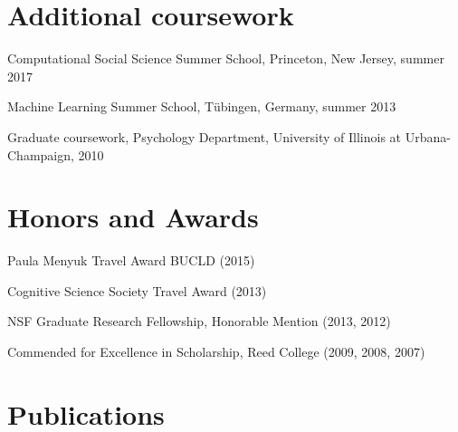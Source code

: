 \documentclass[letterpaper]{article}
\renewenvironment{itemize}{
  \begin{list}{}{
    \setlength{\leftmargin}{1.5em}
  }
}{
  \end{list}
}
\begin{document}
  \section*{Additional coursework}
  \begin{itemize}
     \item Computational Social Science Summer School, Princeton, New Jersey, summer 2017
   \item Machine Learning Summer School, T\"{u}bingen, Germany, summer 2013
   \item Graduate coursework, Psychology Department, University of Illinois at Urbana-Champaign, 2010
\end{itemize}






\section*{Honors and Awards}
\begin{itemize}
\item Paula Menyuk Travel Award BUCLD (2015)
\item Cognitive Science Society Travel Award (2013)
\item NSF Graduate Research Fellowship, Honorable Mention (2013, 2012)
\item Commended for Excellence in Scholarship, Reed College (2009, 2008, 2007)
\end{itemize}




\section*{Publications}
\end{document}
